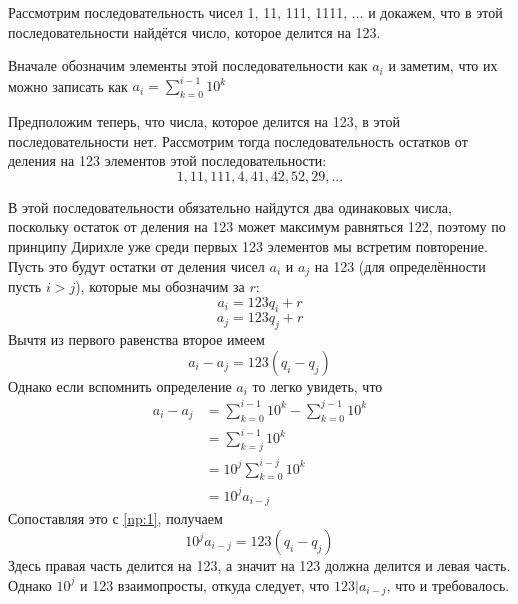 \begin{example}
Рассмотрим последовательность чисел 1, 11, 111, 1111, $\ldots$ и докажем, что в этой последовательности найдётся число, которое делится на 123.

Вначале обозначим элементы этой последовательности как $a_i$ и заметим, что их можно записать как
$a_i = \sum_{k=0}^{i-1}10^k$

Предположим теперь, что числа, которое делится на 123, в этой последовательности нет. Рассмотрим тогда последовательность остатков от деления на 123 элементов этой последовательности:
$$1, 11, 111, 4, 41, 42, 52, 29, \ldots$$

В этой последовательности обязательно найдутся два одинаковых числа, поскольку остаток от деления на 123 может максимум равняться 122, поэтому по принципу Дирихле уже среди первых 123 элементов мы встретим повторение. Пусть это будут остатки от деления чисел $a_i$ и $a_j$ на 123 (для определённости пусть $i>j$), которые мы обозначим за $r$:
$$a_i = 123q_i + r$$
$$a_j = 123q_j + r$$
Вычтя из первого равенства второе имеем
\begin{equation}\label{np:1}
a_i - a_j = 123(q_i - q_j)
\end{equation}
Однако если вспомнить определение $a_i$ то легко увидеть, что
\begin{align*}
a_i - a_j &= \sum_{k=0}^{i-1}10^k - \sum_{k=0}^{j-1}10^k \\&= \sum_{k=j}^{i-1}10^k \\&= 10^j\sum_{k=0}^{i-j}10^k \\&= 10^j a_{i-j}
\end{align*}
Сопоставляя это с \eqref{np:1}, получаем
$$10^j a_{i-j} = 123(q_i - q_j)$$
Здесь правая часть делится на 123, а значит на 123 должна делится и левая часть. Однако $10^j$ и 123 взаимопросты, откуда следует, что $123|a_{i-j}$, что и требовалось.
\end{example}

